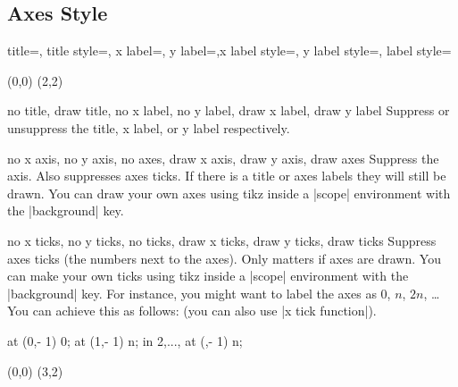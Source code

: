 \documentclass{ltxdoc}
\begin{document}
\begin{sseqdata}[name=ex1,degree={#1}{1-#1}]
\subsection{Axes Style}
\begin{keylist}{title=, title style=, x label=, y label=,x label style=, y label style=, label style=}
\begin{codeexample}[width=6cm]
\begin{sseqpage}[title={An example},
    x label={x axis label}, y label={y axis label},
    label style={blue,font=\small},
    x label style={yshift=10pt},y label style={xshift=10pt}]
\class(0,0)
\class(2,2)
\end{sseqpage}
\end{codeexample}
\end{keylist}


\begin{keylist}{no title, draw title, no x label, no y label, draw x label, draw y label}
Suppress or unsuppress the title, x label, or y label respectively.
\end{keylist}

\begin{keylist}{no x axis, no y axis, no axes, draw x axis, draw y axis, draw axes}
Suppress the axis. Also suppresses axes ticks. If there is a title or axes labels they will still be drawn. You can draw your own axes using tikz inside a |scope| environment with the |background| key.
\end{keylist}

\begin{keylist}{no x ticks, no y ticks, no ticks, draw x ticks, draw y ticks, draw ticks}
Suppress axes ticks (the numbers next to the axes). Only matters if axes are drawn. You can make your own ticks using tikz inside a |scope| environment with the |background| key. For instance, you might want to label the axes as 0, $n$, $2n$, \ldots You can achieve this as follows: (you can also use |x tick function|).
\begin{codeexample}[width=6cm]
\begin{sseqpage}[no x ticks, x range={0}{3}]
\begin{scope}[background]
    \node at (0,\ymin - 1) {0};
    \node at (1,\ymin - 1) {\protect\vphantom{2}n};
\foreach \n in {2,..., \xmax}{
    \node at (\n,\ymin - 1) {\n n};
}
\end{scope}
\class(0,0)
\class(3,2)
\end{sseqpage}
\end{codeexample}
\end{keylist}


\end{sseqdata}
\end{document}
